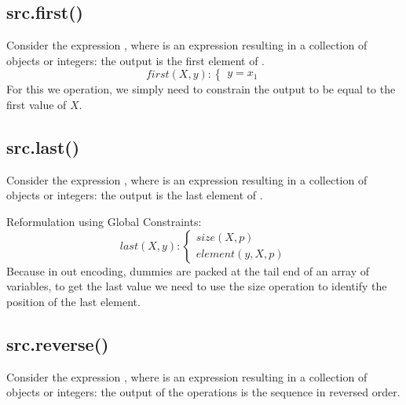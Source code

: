 \subsection{src.first()}
Consider the expression , where  is an expression resulting in a collection of objects or integers: the output is the first element of .
\begin{equation}\label{csp:first}
    first(X,y):
    \begin{cases}
        y = x_1
    \end{cases}
\end{equation}
For this we operation, we simply need to constrain the output to be equal to the first value of $X$.

\subsection{src.last()}
Consider the expression , where  is an expression resulting in a collection of objects or integers: the output is the last element of .

Reformulation using Global Constraints:
\begin{equation}\label{csp:last}
    last(X,y):
    \begin{cases}
        size(X,p)\\
        element(y,X,p)
    \end{cases}
\end{equation}
Because in out encoding, dummies are packed at the tail end of an array of variables, to get the last value we need to use the size operation to identify the position of the last element.

\newpage\subsection{src.reverse()}
Consider the expression , where  is an expression resulting in a collection of objects or integers: the output of the operations is the sequence in reversed order.

